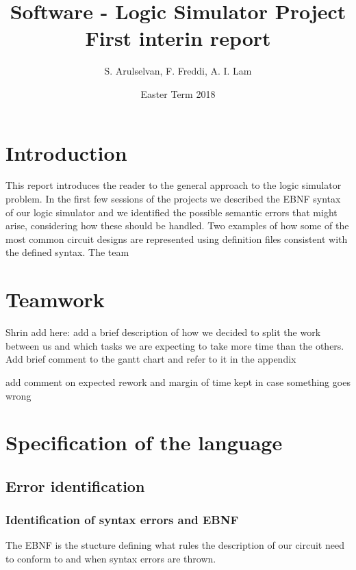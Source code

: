 \documentclass[a4paper,11pt]{article}
\numberwithin{equation}{section}
\begin{document}
	\title{%
		\textbf{Software - Logic Simulator Project
		} \\
		\Large First interin report\\
	}
	\date{Easter Term 2018}
	\author{S. Arulselvan, F. Freddi, A. I. Lam}
	\maketitle
	\thispagestyle{fancy}
	
	
	\lstset{aboveskip=\medskipamount}
	
	\section{Introduction}
This report introduces the reader to the general approach to the logic simulator problem. In the first few sessions of the projects we described the EBNF syntax of our logic simulator and we identified the possible semantic errors that might arise, considering how these should be handled. Two examples of how some of the most common circuit designs are represented using definition files consistent with the defined syntax. The team 

\section{Teamwork}
Shrin add here: add a brief description of how we decided to split the work between us and which tasks we are expecting to take more time than the others. Add brief comment to the gantt chart and refer to it in the appendix

add comment on expected rework and margin of time kept in case something goes wrong

\section{Specification of the language}
\subsection{Error identification}
\subsubsection{Identification of syntax errors and EBNF }
The EBNF is the stucture defining what rules the description of our circuit need to conform to and when syntax errors are thrown.
\end{document}
